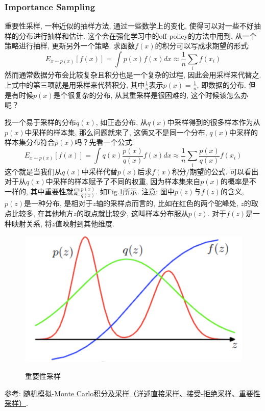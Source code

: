 \subsubsection{Importance Sampling}
重要性采样, 一种近似的抽样方法, 通过一些数学上的变化, 使得可以对一些不好抽样的分布进行抽样和估计. 这个会在强化学习中的off-policy的方法中用到, 从一个策略进行抽样, 更新另外一个策略. 求函数$f(x)$的积分可以写成求期望的形式: 
$$
E_{x \sim p(x)}[f(x)] = \int p(x) f(x) d x \approx \frac{1}{n} \sum_{i} f(x_{i})
$$
然而通常数据分布会比较复杂且积分也是一个复杂的过程, 因此会用采样来代替之. 上式中的第三项就是用采样来代替积分, 其中$\frac{1}{n}$表示$p(x) = \frac{1}{n}$, 即数据的分布. 但是有时候$p(x)$是个很复杂的分布, 从其重采样是很困难的, 这个时候该怎么办呢？

找一个易于采样的分布$q(x)$, 如正态分布, 从$q(x)$中采样得到的很多样本作为从$p(x)$中采样的样本集, 那么问题就来了, 这俩又不是同一个分布, $q(x)$中采样的样本集分布符合$p(x)$吗？先看一个公式: 
$$
E_{x \sim p(x)}[f(x)] = \int q(x) \frac{p(x)}{q(x)} f(x) d x \approx \frac{1}{n} \sum_{i}  \frac{p(x)}{q(x)} f(x_{i})
$$
这个就是当我们从$q(x)$中采样代替$p(x)$后求$f(x)$积分/期望的公式. 可以看出对于从$q(x)$中采样的样本赋予了不同的权重, 因为样本集来自$p(x)$的概率是不一样的, 其中重要性就是$\frac{p(x)}{q(x)}$. 如Fig.\ref{fig:importance-sample}所示. 注意: 图中$p(z)$与$f(z)$的含义, $p(z)$是一种分布, 是相对于$z$轴的采样点而言的, 比如在红色的两个驼峰处, $z$的取点比较多, 在其他地方$z$的取点就比较少, 这叫样本分布服从$p(z)$. 对于$f(z)$是一种映射关系, 将$z$值映射到其他维度. 

\begin{figure}[h]
	\centering
	\includegraphics[width=.5\textwidth]{pics/importance-sample.png}
	\label{fig:importance-sample}
	\caption{重要性采样}
\end{figure}

参考: \href{https://www.jianshu.com/p/3d30070932a8}{随机模拟-Monte Carlo积分及采样（详述直接采样、接受-拒绝采样、重要性采样）}. 


